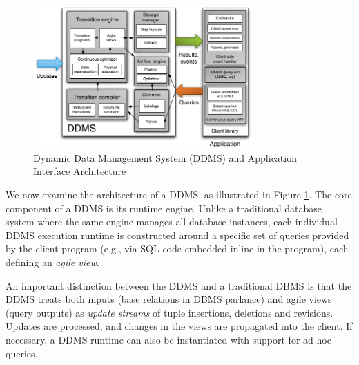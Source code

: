 
\begin{figure}
\begin{center}
\includegraphics[width=3.3in]{graphics/CIDRarch.pdf}
\end{center}
\vspace*{-0.2in}
\caption{Dynamic Data Management System (DDMS) and Application Interface
Architecture}
\label{fig:ddmsarch}
\vspace*{-0.2in}
\end{figure}

We now examine the architecture of a DDMS, as illustrated in Figure
\ref{fig:ddmsarch}.  The core component of a DDMS is its runtime engine.  Unlike
a traditional database system where the same engine manages all database
instances, each individual DDMS execution runtime is constructed around a
specific set of queries provided by the client program (e.g., via SQL code
embedded inline in the program), each defining an \textit{agile view}.


An important distinction between the DDMS and a traditional DBMS is that the
DDMS treats both inputs (base relations in DBMS parlance) and agile views
(query outputs) as \textit{update streams} of tuple insertions, deletions and
revisions.  Updates are processed, and changes in the views are propagated
into the client.  If necessary, a DDMS runtime can also be instantiated with
support for ad-hoc queries.

